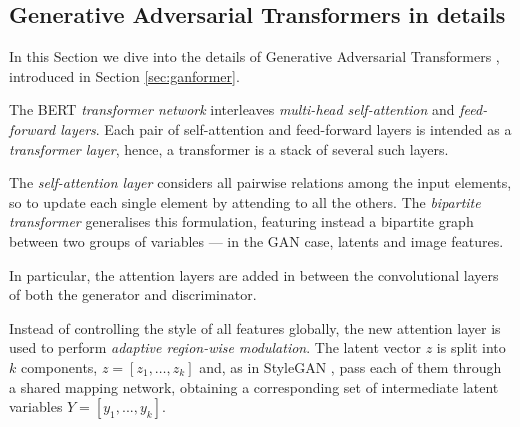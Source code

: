 \documentclass{article}
\begin{document}

	\subsection{Generative Adversarial Transformers in details}\label{subsec:app_methodology}
	In this Section we dive into the details of Generative Adversarial Transformers 
	\cite{hudson2021generative}, introduced in Section \ref{sec:ganformer}. 
	
	The BERT \textit{transformer network} \cite{devlin2019bert} interleaves \textit{multi-head 
	self-attention} and \textit{feed-forward layers}. Each pair of self-attention and feed-forward layers is 
	intended as a \textit{transformer layer}, hence, a transformer is a stack of several such layers. 
	
	The \textit{self-attention layer} considers all pairwise relations among the input elements, so to 
	update each single element by attending to all the others. 
	The \textit{bipartite transformer} generalises this formulation, featuring instead a bipartite graph 
	between two groups of variables — in the GAN case, latents and image features. 

	In particular, the attention layers are added in between the convolutional layers of both the 
	generator and discriminator.
	
	Instead of controlling the style of all features globally, the new attention layer is used to perform 
	\textit{adaptive region-wise modulation}. The latent vector $z$ is split into $k$ components, 
	$z = [z_1 , \dots, z_k ]$ and, as in StyleGAN \cite{karras2019style}, pass each of them through a 
	shared mapping network, obtaining a corresponding set of intermediate latent variables $Y = [y_1 , 
	...,y_k ]$. 
	
\end{document}
